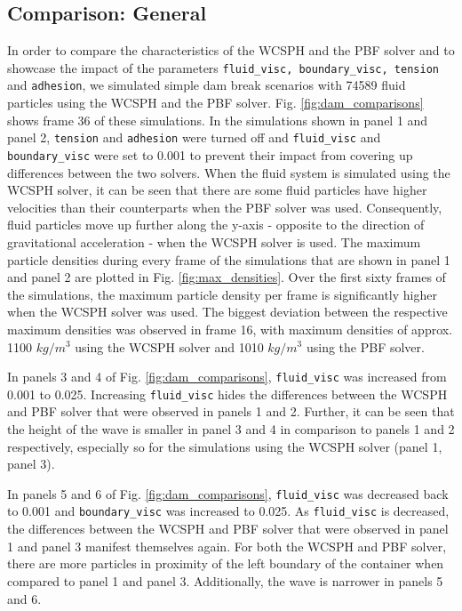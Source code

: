 \documentclass[11pt, letterpaper, twocolumn]{article}
\begin{document}
\subsection{Comparison: General}
\label{subsec:comparison_general}
In order to compare the characteristics of the WCSPH and the PBF solver and to showcase the impact of the parameters \texttt{fluid\_visc, boundary\_visc, tension} and \texttt{adhesion}, we simulated simple dam break scenarios with 74589 fluid particles using the WCSPH and the PBF solver. Fig. \ref{fig:dam_comparisons} shows frame 36 of these
simulations. In the simulations shown in panel 1 and panel 2, \texttt{tension} and \texttt{adhesion} were turned off and \texttt{fluid\_visc} and \texttt{boundary\_visc} were set to 0.001 to prevent their impact from covering up differences between the two solvers. When the fluid system is simulated using the WCSPH solver, it can be seen that
there are some fluid particles have higher velocities than their counterparts when the PBF solver was used. Consequently, fluid particles move up further along the y-axis - opposite to the direction of gravitational acceleration - when the WCSPH solver is used. The maximum particle densities during every frame of the simulations that are shown 
in panel 1 and panel 2 are plotted in Fig. \ref{fig:max_densities}. Over the first sixty frames of the simulations, the maximum particle density per frame is significantly higher when the WCSPH solver was used. The biggest deviation between the respective maximum densities was observed in frame 16, with maximum densities of approx. 
1100 $kg / m^3$ using the WCSPH solver and 1010 $kg / m^3$ using the PBF solver. 

In panels 3 and 4 of Fig. \ref{fig:dam_comparisons}, \texttt{fluid\_visc} was increased from 0.001 to 0.025. Increasing \texttt{fluid\_visc} hides the differences between the WCSPH and PBF solver that were observed in panels 1 and 2. Further, it can be seen that the height of the wave is smaller in panel 3 and 4 in comparison to panels 1 and 2
respectively, especially so for the simulations using the WCSPH solver (panel 1, panel 3).

In panels 5 and 6 of Fig. \ref{fig:dam_comparisons}, \texttt{fluid\_visc} was decreased back to 0.001 and \texttt{boundary\_visc} was increased to 0.025. As \texttt{fluid\_visc} is decreased, the differences between the WCSPH and PBF solver that were observed in panel 1 and panel 3 manifest themselves again. For both the WCSPH and PBF solver, 
there are more particles in proximity of the left boundary of the container when compared to panel 1 and panel 3. Additionally, the wave is narrower in panels 5 and 6. 
\end{document}
